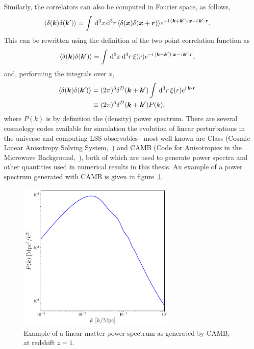 Similarly, the correlators can also be computed in Fourier space, as follows, 
\begin{equation}
	\langle \delta(\bm {k}) \delta(\bm {k}') \rangle = \int \,\mathrm{d}^3 x \,\mathrm{d}^3 r \, \langle \delta(\bm {x}) \delta(\bm {x} + \bm{r})\rangle e^{-\mathrm{i\,} (\bm {k} + \bm {k}') \cdot \bm {x} - \mathrm{i\,} \bm {k}' \cdot \bm{r}}.
\end{equation}
This can be rewritten using the definition of the two-point correlation function as 
\begin{equation}
	\langle \delta(\bm {k}) \delta(\bm {k}') \rangle = \int \,\mathrm{d}^3 x \,\mathrm{d}^3 r \, \xi(r) e^{-\mathrm{i\,} (\bm {k} + \bm {k}') \cdot \bm {x} - \mathrm{i\,} \bm {k}' \cdot \bm{r}},
\end{equation}
and, performing the integrals over $x$, 
\begin{align}
	\langle \delta(\bm {k}) \delta(\bm {k}') \rangle &= (2\pi)^3 \delta^D(\bm {k} + \bm {k}') \int \,\mathrm{d}^3 r \,\xi(r) e^{\mathrm{i\,} \bm {k} \cdot \bm{r}} \\
	&\equiv (2\pi)^3 \delta^D(\bm {k} + \bm {k}') P(k),
\end{align}
where $P(k)$ is by definition the (density) power spectrum. There are several cosmology codes available for simulation the evolution of linear perturbations in the universe and computing LSS observables-- most well known are Class (Cosmic Linear Anisotropy Solving System,~\cite{Lesgourgues:2011}) and CAMB (Code for Anisotropies in the Microwave Background,~\cite{Lewis:1999bs}), both of which are used to generate power spectra and other quantities used in numerical results in this thesis. An example of a power spectrum generated with CAMB is given in figure~\ref{fig:powerspectrum}.
\begin{figure}[!ht]
	\centering
	\includegraphics[width=0.7\textwidth]{fig/matterpower_z1.pdf}
	\caption{Example of a linear matter power spectrum as generated by CAMB, at redshift $z=1$.}
	\label{fig:powerspectrum}
\end{figure}

